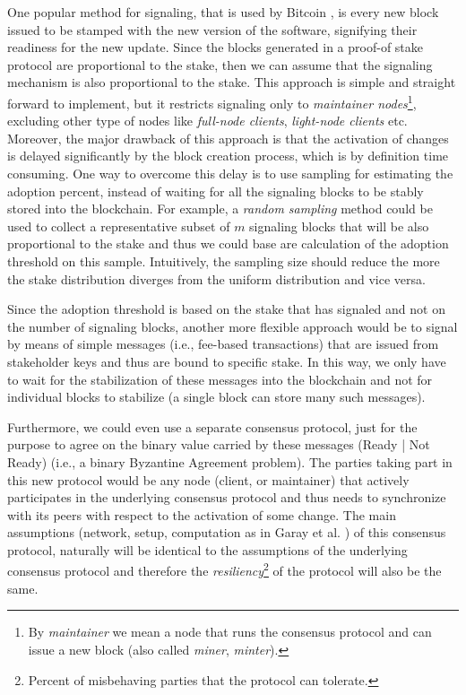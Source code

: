 One popular method for signaling, that is used by Bitcoin \cite{bitcoin}, is every new block issued to be stamped with the new version of the software, signifying their readiness for the new update. Since the blocks generated in a proof-of stake protocol are proportional to the stake, then we can assume that the signaling mechanism is also proportional to the stake. This approach is simple and straight forward to implement, but it restricts signaling only to \emph{maintainer nodes}\footnote{By \emph{maintainer} we mean a node that runs the consensus protocol and can issue a new block (also called \emph{miner}, \emph{minter}).}, excluding other type of nodes like \emph{full-node clients}, \emph{light-node clients} etc. Moreover, the major drawback of this approach is that the activation of changes is delayed significantly by the block creation process, which is by definition time consuming. One way to overcome this delay is to use sampling for estimating the adoption percent, instead of waiting for all the signaling blocks to be stably stored into the blockchain. For example, a \emph{random sampling} method could be used to collect a representative subset of $m$ signaling blocks that will be also proportional to the stake and thus we could base are calculation of the adoption threshold on this sample. Intuitively, the sampling size should reduce the more the stake distribution diverges from the uniform distribution and vice versa.

Since the adoption threshold is based on the stake that has signaled and not on the number of signaling blocks, another more flexible approach would be to signal by means of simple messages (i.e., fee-based transactions) that are issued from stakeholder keys and thus are bound to specific stake. In this way, we only have to wait for the stabilization of these messages into the blockchain and not for individual blocks to stabilize (a single block can store many such messages).

Furthermore, we could even use a separate consensus protocol, just for the purpose to agree on the binary value carried by these messages (Ready | Not Ready) (i.e., a binary Byzantine Agreement problem). The parties taking part in this new protocol would be any node (client, or maintainer) that actively participates in the underlying consensus protocol and thus needs to synchronize with its peers with respect to the activation of some change. The main assumptions (network, setup, computation as in Garay et al. \cite{sok}) of this consensus protocol, naturally will be identical to the assumptions of the underlying consensus protocol and therefore the \emph{resiliency}\footnote{Percent of misbehaving parties that the protocol can tolerate.} of the protocol will also be the same. 

